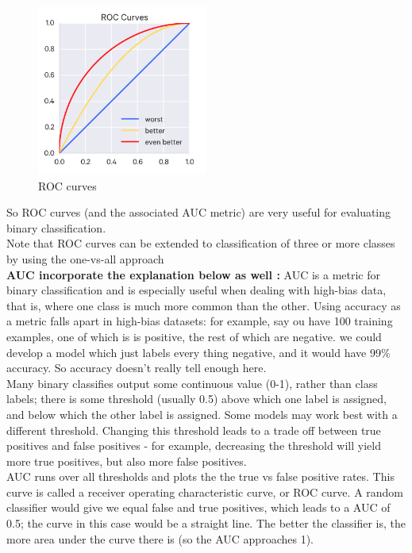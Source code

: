 \begin{figure}[H]
\centering
\includegraphics[width=0.5\textwidth]{img/roc.jpg}
\caption{ ROC curves }
\label{fig:bias2}
\end{figure}
So ROC curves (and the associated AUC metric) are very useful for evaluating binary classification.\\Note that ROC curves can be extended to classification of three or more classes by using the one-vs-all approach \\

\textbf{AUC incorporate the explanation below as well :}
AUC is a metric for binary classification and is especially useful when dealing with high-bias data, that is, where one class is much more common than the other. Using accuracy as a metric falls apart in high-bias datasets: for example, say ou have 100 training examples, one of which is is positive, the rest of which are negative. we could develop a model which just labels every thing negative, and it would have 99\% accuracy. So accuracy doesn't really tell  enough here.\\Many binary classifies output some continuous value (0-1), rather than class labels; there is some threshold (usually 0.5) above which one label is assigned, and below which the other label is assigned. Some models may work best with a different threshold. Changing this threshold leads to a trade off between true positives and false positives - for example, decreasing the threshold will yield more true positives, but also more false positives.\\AUC runs over all thresholds and plots the the true vs false positive rates. This curve is called a receiver operating characteristic curve, or ROC curve. A random classifier would give we equal false and true positives, which leads to a AUC of 0.5; the curve in this case would be a straight line. The better the classifier is, the more area under the curve there is (so the AUC approaches 1).

